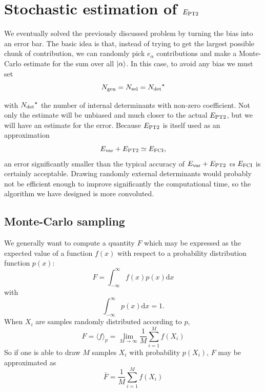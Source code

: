 \documentclass[./thesis.tex]{subfiles}
\begin{document}
\section{Stochastic estimation of $E_\text{PT2}$}

We eventually solved the previously discussed problem by turning the bias into an error bar. The basic idea is that, instead of trying to get the largest possible chunk of contribution, we can randomly pick $e_\alpha$ contributions and make a Monte-Carlo estimate for the sum over all $\ket \alpha$. In this case, to avoid any bias we must set
\begin{equation}
{N_\text{gen}} = {N_\text{sel}} = {N_\text{det}}^\star
\end{equation}

with ${N_\text{det}}^\star$ the number of internal determinants with non-zero coefficient.
Not only the estimate will be unbiased and much closer to the actual $E_\text{PT2}$, but we will have an estimate for the error. Because $E_\text{PT2}$ is itself used as an approximation
\begin{equation}
E_\text{var} + E_\text{PT2} \simeq E_\text{FCI},
\end{equation}
an error significantly smaller than the typical accuracy of $E_\text{var} + E_\text{PT2}$ \textit{vs} $E_\text{FCI}$ is certainly acceptable.
Drawing randomly external determinants would probably not be efficient enough to improve significantly
the computational time, so the algorithm we have designed is more convoluted.


\subsection{Monte-Carlo sampling}

We generally want to compute a quantity $F$ which may be expressed as the expected value of a function $f(x)$ with respect to a probability distribution function $p(x)$:
\begin{equation}
F = \int_{-\infty}^\infty f(x) p(x) \text{d} x
\end{equation}
with 
\begin{equation}
\int_{-\infty}^\infty p(x) \text{d} x = 1.
\end{equation}
When $X_i$ are samples randomly distributed according to $p$, 
\begin{equation}
\label{eq:sum_mc}
F = \langle f \rangle_p =  \lim_{M\rightarrow \infty} \frac{1}{M} \sum_{i=1}^{M} f(X_i)
\end{equation}
So if one is able to draw $M$ samples $X_i$ with probability $p(X_i)$, $F$ may be approximated as
\begin{equation}
\bar{F} = \frac{1}{M} \sum_{i=1}^{M} f(X_i)
\end{equation}
\end{document}
